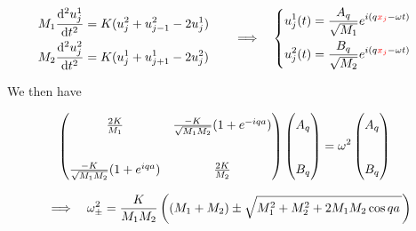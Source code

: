 \begin{frame}
  \begin{equation*}
    \begin{aligned}
      M_1 \frac{\mathrm{d}^2 u_{j}^1}{\mathrm{d}t^2} &= K (u_{j}^2 + u_{j-1}^2 - 2u_{j}^1) \cr
      M_2 \frac{\mathrm{d}^2 u_{j}^2}{\mathrm{d}t^2} &= K (u_{j}^1 + u_{j+1}^1 - 2u_{j}^2)
    \end{aligned}
    \quad \Longrightarrow \quad%
    \left\{
    \begin{aligned}
      u_{j}^1(t) &= \frac{A_q}{\sqrt{M_1}} e^{i(q\mathcolor{red}{x_j} - \omega t)} \cr
      u_{j}^2(t) &= \frac{B_q}{\sqrt{M_2}} e^{i(q\mathcolor{red}{x_j} - \omega t)} \cr
    \end{aligned}
    \right.
  \end{equation*}

  We then have

    \begin{equation*}
      \begin{aligned}
        \begin{pmatrix}
            \renewcommand*{\arraystretch}{1.5}
            \frac{2K}{M_1} & \frac{-K}{\sqrt{M_1M_2}}(1+e^{-iqa}) \\
            \phantom{.} \\
            \frac{-K}{\sqrt{M_1M_2}}(1+e^{iqa}) & \frac{2K}{M_2}
        \end{pmatrix}
        \begin{pmatrix}
        A_q \\
        \phantom{a} \\
        B_q 
        \end{pmatrix}
        &=
        \omega^2
        \begin{pmatrix}
        A_q \\
        \phantom{a} \\
        B_q 
        \end{pmatrix}
      \end{aligned}
    \end{equation*}
    
    \medskip
    \begin{equation*}
      \Longrightarrow \quad \omega_\pm^2 = {K\over M_1M_2} \left((M_1 + M_2) \pm \sqrt{M_1^2 + M_2^2 + 2M_1M_2\cos{qa}\,}\right)
    \end{equation*}
\end{frame}